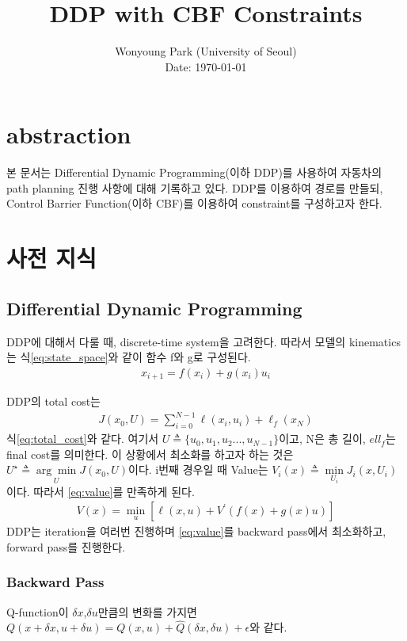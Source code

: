 \documentclass[journal]{IEEEtran}
\begin{document}
\title{DDP with CBF Constraints}

\author{Wonyoung Park (University of Seoul)\\ 
        Date: \today
        }

\maketitle

\section{abstraction}
본 문서는 Differential Dynamic Programming(이하 DDP)를 사용하여 자동차의 path planning 진행 사항에 대해 기록하고 있다. DDP를 이용하여 경로를 만들되, Control Barrier Function(이하 CBF)를 이용하여 constraint를 구성하고자 한다. 

\section{사전 지식}
\subsection{Differential Dynamic Programming}
DDP에 대해서 다룰 때, discrete-time system을 고려한다. 따라서 모델의 kinematics는 식\eqref{eq:state_space}와 같이 함수 f와 g로 구성된다.
\begin{align}
	x_{i+1}=f(x_{i})+g(x_{i})u_{i}
	\label{eq:state_space}
\end{align}

DDP의 total cost는
\begin{align}
	J(x_0,U)=\sum_{i=0}^{N-1} \ell(x_i,u_i)+\ell_f(x_N)
	\label{eq:total_cost}
\end{align}
식\eqref{eq:total_cost}와 같다. 여기서 $U \triangleq \{u_0,u_1,u_2...,u_{N-1}\}$이고, N은 총 길이, $ell_f$는 final cost를 의미한다.
이 상황에서 최소화를 하고자 하는 것은 $U^{\star}\triangleq\underset{U}{\arg\min} J(x_0,U)$이다.
i번째 경우일 때 Value는 $V_i(x)\triangleq \underset{U_i}{\min}J_i(x,U_i)$이다. 따라서 \eqref{eq:value}를 만족하게 된다.
\begin{align}
	 V(x)=\underset{u}{\min}[\ell(x,u)+V^{\prime}(f(x)+g(x)u)]
	\label{eq:value}
\end{align}
DDP는 iteration을 여러번 진행하며 \eqref{eq:value}를 backward pass에서 최소화하고, forward pass를 진행한다.

\subsubsection{Backward Pass}
Q-function이 $\delta x$,$\delta u$만큼의 변화를 가지면 $Q(x+\delta x,u+\delta u)=Q(x,u)+\hat{Q}(\delta x,\delta u)+\epsilon$와 같다.
\end{document}
